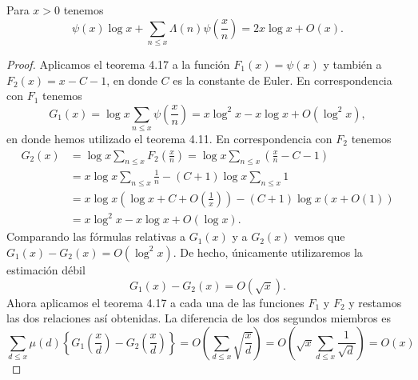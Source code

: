 \documentclass[12pt,a4paper]{book}
\begin{document}
    \begin{teorema}
        Para $x>0$ tenemos
        \begin{equation}
            \psi(x)\log x+\sum_{n\leq x}\Lambda(n)\psi\left(\frac{x}{n}\right)=2x\log x+O(x).
        \end{equation}
    \end{teorema}

    \begin{proof}
        Aplicamos el teorema 4.17 a la función $F_{1}(x)=\psi(x)$ y también a
        $F_{2}(x)=x-C-1$, en donde $C$ es la constante de Euler. En correspondencia con
        $F_{1}$ tenemos
        \begin{equation*}
            G_{1}(x)=\log x\sum_{n\leq x}\psi\left(\frac{x}{n}\right)=x\log^{2}x-x\log x+O(\log^{2}x),
        \end{equation*}
        en donde hemos utilizado el teorema 4.11. En correspondencia con $F_{2}$
        tenemos
        \begin{align*}
            G_{2}(x)&=\log x\sum_{n\leq x}F_{2}\left(\frac{x}{n}\right)=\log x\sum_{n\leq x}\left(\frac{x}{n}-C-1\right)\\
            &=x\log x\sum_{n\leq x}\frac{1}{n}-(C+1)\log x\sum_{n\leq x}1\\
            &=x\log x\left(\log x+C+O\left(\frac{1}{x}\right)\right)-(C+1)\log x(x+O(1))\\
            &=x\log^{2}x-x\log x+O(\log x).
        \end{align*}
        Comparando las fórmulas relativas a $G_{1}(x)$ y a $G_{2}(x)$ vemos que
        $G_{1}(x)-G_{2}(x)=O(\log^{2}x)$. De hecho, únicamente utilizaremos la estimación
        débil
        \begin{equation*}
            G_{1}(x)-G_{2}(x)=O(\sqrt{x}).
        \end{equation*}
        Ahora aplicamos el teorema 4.17 a cada una de las funciones $F_{1}$ y $F_{2}$ y
        restamos las dos relaciones así obtenidas. La diferencia de los dos segundos
        miembros es
        \begin{equation*}
            \sum_{d\leq x}\mu(d)\left\{G_{1}\left(\frac{x}{d}\right)-G_{2}\left(\frac{x}{d}\right)\right\}
            =O\left(\sum_{d\leq x}\sqrt{\frac{x}{d}}\right)=O\left(\sqrt{x}\sum_{d\leq x}\frac{1}{\sqrt{d}}\right)=O(x)
        \end{equation*}

\end{proof}
\end{document}
